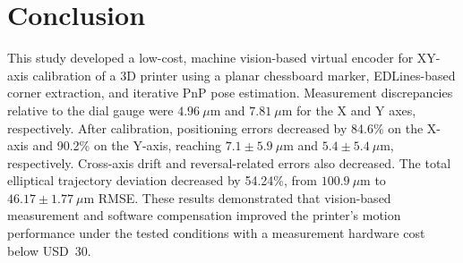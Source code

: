 \documentclass[journal]{IEEEtran}
\begin{document}
\section{Conclusion}
\label{conclusion}
This study developed a low-cost, machine vision-based virtual encoder for XY-axis calibration of a 3D printer using a planar chessboard marker, EDLines-based corner extraction, and iterative PnP pose estimation. Measurement discrepancies relative to the dial gauge were $4.96~\mu\text{m}$ and $7.81~\mu\text{m}$ for the X and Y axes, respectively. After calibration, positioning errors decreased by 84.6\% on the X-axis and 90.2\% on the Y-axis, reaching $7.1 \pm 5.9~\mu\text{m}$ and $5.4 \pm 5.4~\mu\text{m}$, respectively. Cross-axis drift and reversal-related errors also decreased. The total elliptical trajectory deviation decreased by 54.24\%, from $100.9~\mu\text{m}$ to $46.17 \pm 1.77~\mu\text{m}$ RMSE. These results demonstrated that vision-based measurement and software compensation improved the printer's motion performance under the tested conditions with a measurement hardware cost below USD~30.



\end{document}
